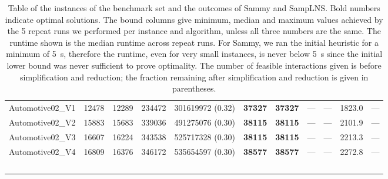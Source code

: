 \begin{table*}
\begin{tiny}
{{\begin{tabular}{lrrrrrrrrrr}
Automotive02\_V1 & \num[text-series-to-math=true]{12478} & \num[text-series-to-math=true]{12289} & \num[text-series-to-math=true]{234472} & \num[text-series-to-math=true]{301619972} (\num[text-series-to-math=true]{0.32}) & \textbf{\num[text-series-to-math=true]{37327}} & \textbf{\num[text-series-to-math=true]{37327}} & --- & --- & 1823.0 & ---\\
Automotive02\_V2 & \num[text-series-to-math=true]{15883} & \num[text-series-to-math=true]{15683} & \num[text-series-to-math=true]{339036} & \num[text-series-to-math=true]{491275076} (\num[text-series-to-math=true]{0.30}) & \textbf{\num[text-series-to-math=true]{38115}} & \textbf{\num[text-series-to-math=true]{38115}} & --- & --- & 2101.9 & ---\\
Automotive02\_V3 & \num[text-series-to-math=true]{16607} & \num[text-series-to-math=true]{16224} & \num[text-series-to-math=true]{343538} & \num[text-series-to-math=true]{525717328} (\num[text-series-to-math=true]{0.30}) & \textbf{\num[text-series-to-math=true]{38115}} & \textbf{\num[text-series-to-math=true]{38115}} & --- & --- & 2213.3 & ---\\
Automotive02\_V4 & \num[text-series-to-math=true]{16809} & \num[text-series-to-math=true]{16376} & \num[text-series-to-math=true]{346172} & \num[text-series-to-math=true]{535654597} (\num[text-series-to-math=true]{0.30}) & \textbf{\num[text-series-to-math=true]{38577}} & \textbf{\num[text-series-to-math=true]{38577}} & --- & --- & 2272.8 & ---\\
\hline\ \\
\end{tabular}}}
\end{tiny}
\caption{Table of the instances of the benchmark set and the outcomes of Sammy and SampLNS.
Bold numbers indicate optimal solutions.
The bound columns give minimum, median and maximum values achieved by the \num{5} repeat runs we performed per instance and algorithm, unless all three numbers are the same.
The runtime shown is the median runtime across repeat runs.
For Sammy, we ran the initial heuristic for a minimum of \qty{5}{s}, therefore the runtime, even for very small instances,
is never below \qty{5}{s} since the initial lower bound was never sufficient to prove optimality.
The number of feasible interactions given is before simplification and reduction;
the fraction remaining after simplification and reduction is given in parentheses.}
\label{tab:instance_summary}
\end{table*}
      
